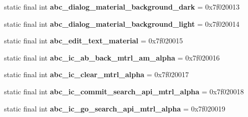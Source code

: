 \begin{DoxyCompactItemize}
\item 
\hypertarget{classandroid_1_1support_1_1v7_1_1appcompat_1_1_r_1_1drawable_a3c54c69c5b2e413b84ff3c1a7c96290b}{}static final int {\bfseries abc\+\_\+dialog\+\_\+material\+\_\+background\+\_\+dark} = 0x7f020013\label{classandroid_1_1support_1_1v7_1_1appcompat_1_1_r_1_1drawable_a3c54c69c5b2e413b84ff3c1a7c96290b}

\item 
\hypertarget{classandroid_1_1support_1_1v7_1_1appcompat_1_1_r_1_1drawable_a092c3cbf7c96dd74237cec7fc5fc506d}{}static final int {\bfseries abc\+\_\+dialog\+\_\+material\+\_\+background\+\_\+light} = 0x7f020014\label{classandroid_1_1support_1_1v7_1_1appcompat_1_1_r_1_1drawable_a092c3cbf7c96dd74237cec7fc5fc506d}

\item 
\hypertarget{classandroid_1_1support_1_1v7_1_1appcompat_1_1_r_1_1drawable_a0022fde7523d3f42a2d9ea2591085cd0}{}static final int {\bfseries abc\+\_\+edit\+\_\+text\+\_\+material} = 0x7f020015\label{classandroid_1_1support_1_1v7_1_1appcompat_1_1_r_1_1drawable_a0022fde7523d3f42a2d9ea2591085cd0}

\item 
\hypertarget{classandroid_1_1support_1_1v7_1_1appcompat_1_1_r_1_1drawable_a5abc07bf4568749640d49bdb0fc5184b}{}static final int {\bfseries abc\+\_\+ic\+\_\+ab\+\_\+back\+\_\+mtrl\+\_\+am\+\_\+alpha} = 0x7f020016\label{classandroid_1_1support_1_1v7_1_1appcompat_1_1_r_1_1drawable_a5abc07bf4568749640d49bdb0fc5184b}

\item 
\hypertarget{classandroid_1_1support_1_1v7_1_1appcompat_1_1_r_1_1drawable_a474cb3540b3a35748a8806885c659f7a}{}static final int {\bfseries abc\+\_\+ic\+\_\+clear\+\_\+mtrl\+\_\+alpha} = 0x7f020017\label{classandroid_1_1support_1_1v7_1_1appcompat_1_1_r_1_1drawable_a474cb3540b3a35748a8806885c659f7a}

\item 
\hypertarget{classandroid_1_1support_1_1v7_1_1appcompat_1_1_r_1_1drawable_a7755f018f8cfed959a6a680cc2eba8a3}{}static final int {\bfseries abc\+\_\+ic\+\_\+commit\+\_\+search\+\_\+api\+\_\+mtrl\+\_\+alpha} = 0x7f020018\label{classandroid_1_1support_1_1v7_1_1appcompat_1_1_r_1_1drawable_a7755f018f8cfed959a6a680cc2eba8a3}

\item 
\hypertarget{classandroid_1_1support_1_1v7_1_1appcompat_1_1_r_1_1drawable_a33c53467e457eda373e8d8501c9c7b4c}{}static final int {\bfseries abc\+\_\+ic\+\_\+go\+\_\+search\+\_\+api\+\_\+mtrl\+\_\+alpha} = 0x7f020019\label{classandroid_1_1support_1_1v7_1_1appcompat_1_1_r_1_1drawable_a33c53467e457eda373e8d8501c9c7b4c}


\end{DoxyCompactItemize}
